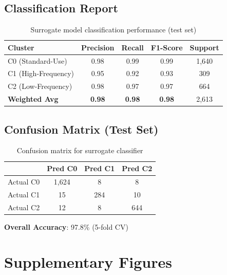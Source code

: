 \documentclass[a4paper,12pt]{article}
\begin{document}
\subsection{Classification Report}

\begin{table}[htbp]
    \centering
    \caption{Surrogate model classification performance (test set)}
    \begin{tabular}{lcccc}
        \toprule
        Cluster & Precision & Recall & F1-Score & Support \\
        \midrule
        C0 (Standard-Use) & 0.98 & 0.99 & 0.99 & 1,640 \\
        C1 (High-Frequency) & 0.95 & 0.92 & 0.93 & 309 \\
        C2 (Low-Frequency) & 0.98 & 0.97 & 0.97 & 664 \\
        \midrule
        \textbf{Weighted Avg} & \textbf{0.98} & \textbf{0.98} & \textbf{0.98} & 2,613 \\
        \bottomrule
    \end{tabular}
\end{table}

\subsection{Confusion Matrix (Test Set)}

\begin{table}[htbp]
    \centering
    \caption{Confusion matrix for surrogate classifier}
    \begin{tabular}{l|ccc}
        \toprule
         & Pred C0 & Pred C1 & Pred C2 \\
        \midrule
        Actual C0 & 1,624 & 8 & 8 \\
        Actual C1 & 15 & 284 & 10 \\
        Actual C2 & 12 & 8 & 644 \\
        \bottomrule
    \end{tabular}
\end{table}

\textbf{Overall Accuracy}: 97.8\% (5-fold CV)

\newpage
\section{Supplementary Figures}
\end{document}
